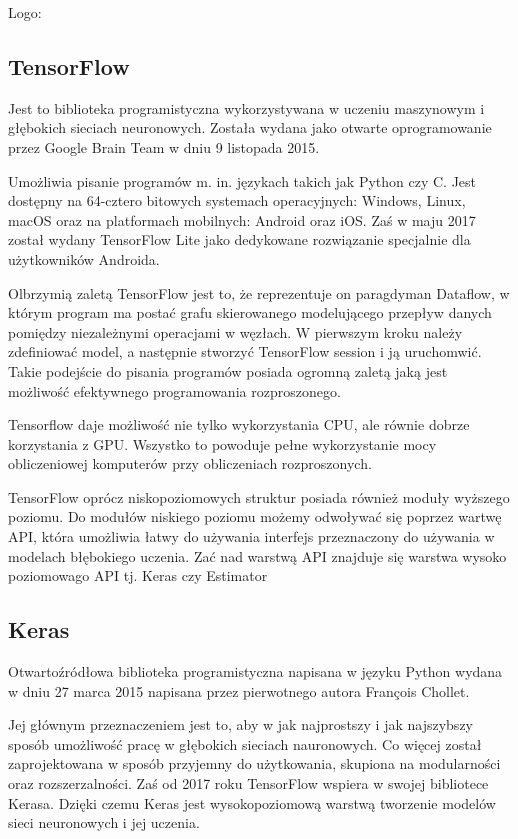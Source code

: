 \documentclass[a4paper,12pt,twoside,openany]{report}
\begin{document}
Logo:

\subsection{TensorFlow}
Jest to biblioteka programistyczna wykorzystywana w uczeniu maszynowym i głębokich sieciach neuronowych. Została wydana jako otwarte oprogramowanie przez Google Brain Team w dniu 9 listopada 2015.

Umożliwia pisanie programów m. in. językach takich jak Python czy C. Jest dostępny na 64-cztero bitowych systemach operacyjnych: Windows, Linux, macOS oraz na platformach mobilnych: Android oraz iOS. Zaś w maju 2017 został wydany TensorFlow Lite jako dedykowane rozwiązanie specjalnie dla użytkowników Androida.

Olbrzymią zaletą TensorFlow jest to, że reprezentuje on paragdyman Dataflow, w którym program ma postać grafu skierowanego modelującego przepływ danych pomiędzy niezależnymi operacjami w węzłach. W pierwszym kroku należy zdefiniować model, a następnie stworzyć TensorFlow session i ją uruchomwić. Takie podejście do pisania programów posiada ogromną zaletą jaką jest możliwość efektywnego programowania rozproszonego. 

Tensorflow daje możliwość nie tylko wykorzystania CPU, ale równie dobrze korzystania z GPU. Wszystko to powoduje pełne wykorzystanie mocy obliczeniowej komputerów przy obliczeniach rozproszonych.

TensorFlow oprócz niskopoziomowych struktur posiada również moduły wyższego poziomu. Do modułów niskiego poziomu możemy odwoływać się poprzez wartwę API, która umożliwia łatwy do używania interfejs przeznaczony do używania w modelach błębokiego uczenia. Zać nad warstwą API znajduje się warstwa wysoko poziomowago API tj. Keras czy Estimator

\subsection{Keras}
Otwartoźródłowa biblioteka programistyczna napisana w języku Python wydana w dniu 27 marca 2015 napisana przez pierwotnego autora François Chollet. 

Jej głównym przeznaczeniem jest to, aby w jak najprostszy i  jak najszybszy sposób umożliwość pracę w głębokich sieciach nauronowych. Co więcej został zaprojektowana w sposób przyjemny do użytkowania, skupiona na modularności oraz rozszerzalności. Zaś od 2017 roku TensorFlow wspiera w swojej bibliotece Kerasa. Dzięki czemu Keras jest wysokopoziomową warstwą tworzenie modelów sieci neuronowych i jej uczenia.
\end{document}
